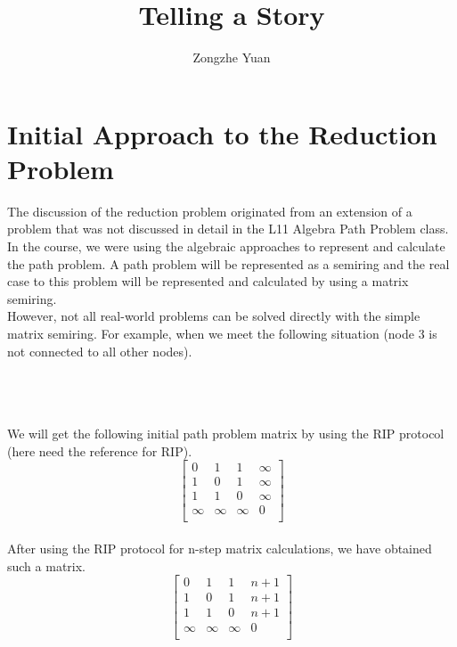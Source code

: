 \documentclass[a4paper,10pt]{article}
\title{Telling a Story}
\author{Zongzhe Yuan}
\begin{document}
\maketitle

\section{Initial Approach to the Reduction Problem}
The discussion of the reduction problem originated from an extension of a problem that was not discussed in detail in the L11 Algebra Path Problem class. \\
In the course, we were using the algebraic approaches to represent and calculate the path problem. A path problem will be represented as a semiring and the real case to this problem will be represented and calculated by using a matrix semiring.\\
However, not all real-world problems can be solved directly with the simple matrix semiring. 
For example, when we meet the following situation (node 3 is not connected to all other nodes).\\\\
\\\\
We will get the following initial path problem matrix by using the RIP protocol (here need the reference for RIP).
\[
\begin{bmatrix}
    0 & 1 & 1 & \infty \\
    1 & 0 & 1 & \infty \\
    1 & 1 & 0 & \infty \\
    \infty & \infty & \infty & 0 \\
\end{bmatrix}
\]\\
After using the RIP protocol for n-step matrix calculations, we have obtained such a matrix.
\[
\begin{bmatrix}
    0 & 1 & 1 & n+1 \\
    1 & 0 & 1 & n+1 \\
    1 & 1 & 0 & n+1 \\
    \infty & \infty & \infty & 0 \\
\end{bmatrix}
\]\\
\end{document}
